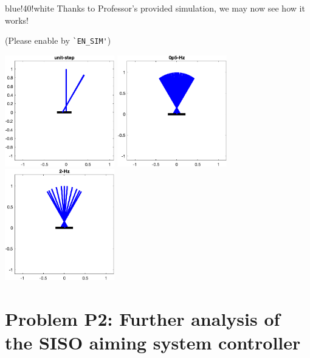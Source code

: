 \documentclass{tron}
\begin{document}
	\begin{note}{blue!40!white}{}
		Thanks to Professor's provided simulation, we may now see how it works! 
		
		(Please enable by \verb|`EN_SIM'|)
		
		{	
			\centering\includegraphics[width=180px]{../matlab/output/q1/sim_unit-step}
		}
		{	
			\centering\includegraphics[width=180px]{../matlab/output/q1/sim_0p5-Hz}
		}
		{	
			\centering\includegraphics[width=180px]{../matlab/output/q1/sim_2-Hz}
		}

	\end{note}


\newpage
\section{Problem P2: Further analysis of the SISO aiming system controller}
\vspace{5pt}
\end{document}
